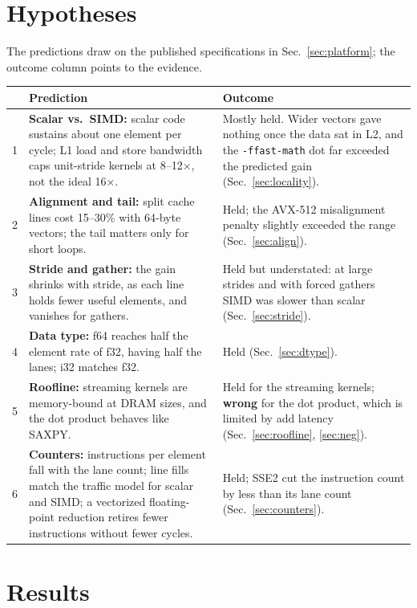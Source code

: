 \documentclass{article}
\begin{document}
\section{Hypotheses}\label{sec:hyp}
The predictions draw on the published specifications in Sec.~\ref{sec:platform}; the outcome column points to the evidence.
\begin{center}\small
\begin{tabularx}{\linewidth}{@{}lXX@{}}
\toprule
& \textbf{Prediction} & \textbf{Outcome} \\
\midrule
1 & \textbf{Scalar vs.\ SIMD:} scalar code sustains about one element per cycle; L1 load and store bandwidth caps unit-stride kernels at 8--12$\times$, not the ideal 16$\times$. & Mostly held. Wider vectors gave nothing once the data sat in L2, and the \texttt{-ffast-math} dot far exceeded the predicted gain (Sec.~\ref{sec:locality}). \\
2 & \textbf{Alignment and tail:} split cache lines cost 15--30\% with 64-byte vectors; the tail matters only for short loops. & Held; the AVX-512 misalignment penalty slightly exceeded the range (Sec.~\ref{sec:align}). \\
3 & \textbf{Stride and gather:} the gain shrinks with stride, as each line holds fewer useful elements, and vanishes for gathers. & Held but understated: at large strides and with forced gathers SIMD was slower than scalar (Sec.~\ref{sec:stride}). \\
4 & \textbf{Data type:} f64 reaches half the element rate of f32, having half the lanes; i32 matches f32. & Held (Sec.~\ref{sec:dtype}). \\
5 & \textbf{Roofline:} streaming kernels are memory-bound at DRAM sizes, and the dot product behaves like SAXPY. & Held for the streaming kernels; \textbf{wrong} for the dot product, which is limited by add latency (Sec.~\ref{sec:roofline}, \ref{sec:neg}). \\
6 & \textbf{Counters:} instructions per element fall with the lane count; line fills match the traffic model for scalar and SIMD; a vectorized floating-point reduction retires fewer instructions without fewer cycles. & Held; SSE2 cut the instruction count by less than its lane count (Sec.~\ref{sec:counters}). \\
\bottomrule
\end{tabularx}
\end{center}

\section{Results}\label{sec:results}
\end{document}
